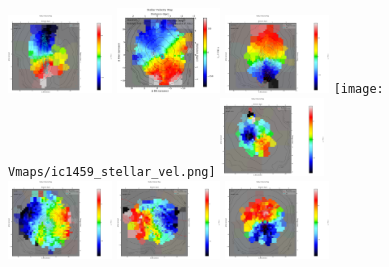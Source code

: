 \begin{figure}
      \centering
      \includegraphics[width=0.245\textwidth]{Vmaps/ngc0612_stellar_vel.png}
      \includegraphics[width=0.245\textwidth]{Vmaps/ngc3557_stellar_vel.png}
      \includegraphics[width=0.245\textwidth]{Vmaps/ngc3100_stellar_vel.png}
      \texttt{[image: Vmaps/ic1459\_stellar\_vel.png]}
      \includegraphics[width=0.245\textwidth]{Vmaps/pks0718-34_stellar_vel.png}
      \includegraphics[width=0.245\textwidth]{Vmaps/ic4296_stellar_vel.png}
      \includegraphics[width=0.245\textwidth]{Vmaps/ngc7075_stellar_vel.png}
      \includegraphics[width=0.245\textwidth]{Vmaps/ic1531_stellar_vel.png}

\end{figure}

